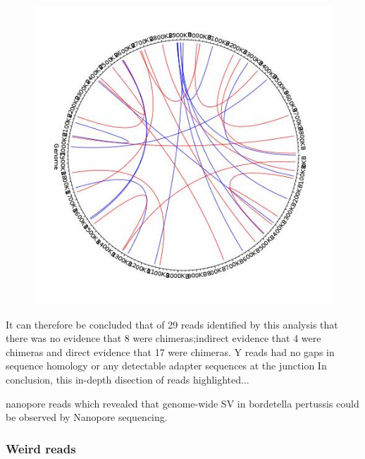 \begin{figure}[h!]
\centering
\includegraphics[width=\textwidth{}]{Chapter_2/UK54_new_basketball.jpeg}
\caption{  }
\label{fig:UK54_new_basket}
\end{figure}

It can therefore be concluded that of 29 reads identified by this analysis that there was no evidence that 8 were chimeras;indirect evidence that 4 were chimeras and direct evidence that 17 were chimeras.
Y reads had no gaps in sequence homology or any detectable adapter sequences at the junction
In conclusion, this in-depth disection of reads highlighted...


nanopore reads which revealed that genome-wide SV in bordetella pertussis could be observed by Nanopore sequencing. 



\subsubsection{Weird reads}

